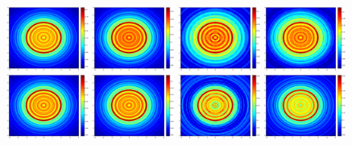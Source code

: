 \documentclass[12pt]{iopart}
\begin{document}
\begin{figure}
	\centering
	\includegraphics[width=0.24\textwidth]{./graphic_phase/circle_r_10_k_4_vector.eps}
	\includegraphics[width=0.24\textwidth]{./graphic_phase/circle_r_10_k_4_scalar.eps}
	\includegraphics[width=0.24\textwidth]{./graphic_phase/circle_r_10_k_4_phaseless_n_128_bias_100.eps}
	\includegraphics[width=0.24\textwidth]{./graphic_phase/circle_r_10_k_4_phaseless_n_512_bias_100.eps}
	\includegraphics[width=0.24\textwidth]{./graphic_phase/circle_r_100_k_4_vector.eps}
	\includegraphics[width=0.24\textwidth]{./graphic_phase/circle_r_100_k_4_scalar.eps}
	\includegraphics[width=0.24\textwidth]{./graphic_phase/circle_r_100_k_4_phaseless_n_128_bias_100.eps}
	\includegraphics[width=0.24\textwidth]{./graphic_phase/circle_r_100_k_4_phaseless_n_512_bias_100.eps}


\end{figure}
\end{document}
